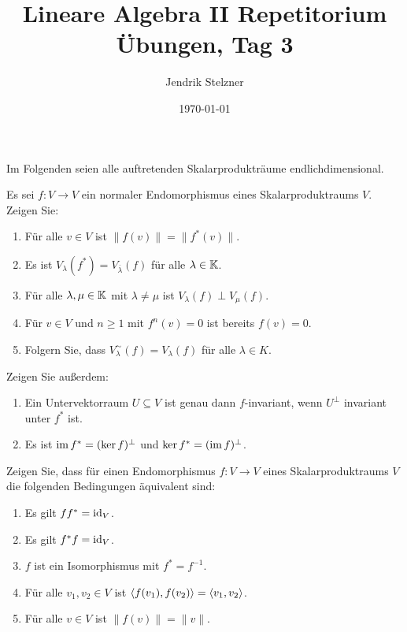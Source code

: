 \documentclass[a4paper, 10pt]{scrartcl}
\title{Lineare Algebra II Repetitorium \\ Übungen, Tag 3}
\author{Jendrik Stelzner}
\date{\today}
\begin{document}
\maketitle


Im Folgenden seien alle auftretenden Skalarprodukträume endlichdimensional.


\begin{question}
  Es sei $f \colon V \to V$ ein normaler Endomorphismus eines Skalarproduktraums $V$.
  Zeigen Sie:
  \begin{enumerate}[leftmargin=*]
    \item
      Für alle $v \in V$ ist $\|f(v)\| = \|f^*(v)\|$.
    \item
      Es ist $V_\lambda(f^*) = V_{\overline{\lambda}}(f)$ für alle $\lambda \in \mathbb{K}$.
    \item
      Für alle $\lambda, \mu \in \mathbb{K}$ mit $\lambda \neq \mu$ ist $V_\lambda(f) \perp V_\mu(f)$.
    \item
      Für $v \in V$ und $n \geq 1$ mit $f^n(v) = 0$ ist bereits $f(v) = 0$.
    \item
      Folgern Sie, dass $V^\sim_\lambda(f) = V_\lambda(f)$ für alle $\lambda \in K$.
  \end{enumerate}
  Zeigen Sie außerdem:
  \begin{enumerate}[leftmargin=*, resume]
    \item
      Ein Untervektorraum $U \subseteq V$ ist genau dann $f$-invariant, wenn $U^\perp$ invariant unter $f^*$ ist.
    \item
      Es ist $\operatorname{im} f^* = (\ker f)^\perp$ und $\ker f^* = (\operatorname{im} f)^\perp$.
  \end{enumerate}
\end{question}


\begin{question}
  Zeigen Sie, dass für einen Endomorphismus $f \colon V \to V$ eines Skalarproduktraums $V$ die folgenden Bedingungen äquivalent sind:
  \begin{enumerate}[leftmargin=*]
    \item
      Es gilt $f f^* = \operatorname{id}_V$.
    \item
      Es gilt $f^* f = \operatorname{id}_V$.
    \item
      $f$ ist ein Isomorphismus mit $f^* = f^{-1}$.
    \item
      Für alle $v_1, v_2 \in V$ ist $\left\langle f(v_1), f(v_2) \right\rangle = \left\langle v_1, v_2 \right\rangle$.
    \item
      Für alle $v \in V$ ist $\|f(v)\| = \|v\|$.
  \end{enumerate}
\end{question}
\end{document}
